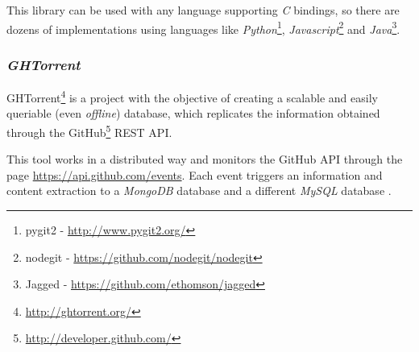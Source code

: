 This library can be used with any language supporting \emph{C} bindings, so there are dozens of implementations using languages like \emph{Python}\footnote{pygit2 - \url{http://www.pygit2.org/}}, \emph{Javascript}\footnote{nodegit - \url{https://github.com/nodegit/nodegit}} and \emph{Java}\footnote{Jagged - \url{https://github.com/ethomson/jagged}}.

\subsubsection{\emph{GHTorrent}}

GHTorrent\footnote{\url{http://ghtorrent.org/}} is a project with the objective of creating a scalable and easily queriable (even \emph{offline}) database, which replicates the information obtained through the GitHub\footnote{\url{http://developer.github.com/}} REST API.

This tool works in a distributed way and monitors the GitHub API through the page \url{https://api.github.com/events}. Each event triggers an information and content extraction to a \emph{MongoDB} database and a different \emph{MySQL} database \cite{Gousios2012}.